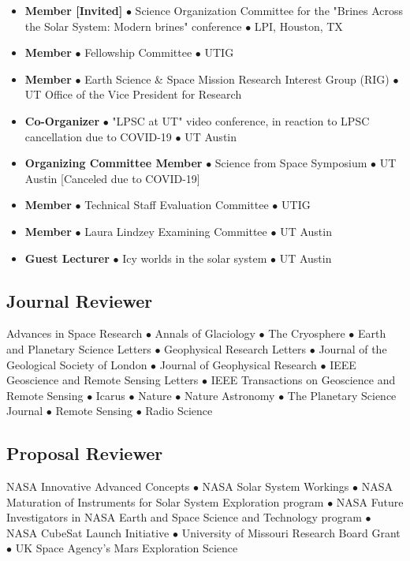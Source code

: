 \begin{itemize}[leftmargin=5.8em, labelsep=1.5em]
    \item[\texttt{2021}] \textbf{Member [Invited]} $\bullet$ Science Organization Committee for the "Brines Across the Solar System: Modern brines" conference $\bullet$ LPI, Houston, TX
    \item[\texttt{2019-2021}] \textbf{Member} $\bullet$ Fellowship Committee $\bullet$ UTIG
    \item[\texttt{2019-2020}] \textbf{Member} $\bullet$ Earth Science \& Space Mission Research Interest Group (RIG) $\bullet$ UT Office of the Vice President for Research
    \item[\texttt{2020}] \textbf{Co-Organizer} $\bullet$ "LPSC at UT" video conference, in reaction to LPSC cancellation due to COVID-19 $\bullet$ UT Austin
    \item[\texttt{2020}] \textbf{Organizing Committee Member} $\bullet$ Science from Space Symposium $\bullet$ UT Austin [Canceled due to COVID-19]
    \item[\texttt{2017-18}] \textbf{Member} $\bullet$ Technical Staff Evaluation Committee $\bullet$ UTIG
    \item[\texttt{2017}] \textbf{Member} $\bullet$ Laura Lindzey Examining Committee $\bullet$ UT Austin
    \item[\texttt{2016}] \textbf{Guest Lecturer} $\bullet$ Icy worlds in the solar system $\bullet$ UT Austin
\end{itemize}

\vspace{-2em}
\subsection*{Journal Reviewer}

Advances in Space Research $\bullet$ Annals of Glaciology $\bullet$ The Cryosphere $\bullet$ Earth and Planetary Science Letters $\bullet$ Geophysical Research Letters $\bullet$ Journal of the Geological Society of London $\bullet$ Journal of Geophysical Research $\bullet$ IEEE Geoscience and Remote Sensing Letters $\bullet$ IEEE Transactions on Geoscience and Remote Sensing $\bullet$ Icarus $\bullet$ Nature $\bullet$ Nature Astronomy $\bullet$ The Planetary Science Journal $\bullet$ Remote Sensing $\bullet$ Radio Science

\vspace{-1em}
\subsection*{Proposal Reviewer}
 NASA Innovative Advanced Concepts $\bullet$ NASA Solar System Workings $\bullet$ NASA Maturation of Instruments for Solar System Exploration program $\bullet$ NASA Future Investigators in NASA Earth and Space Science and Technology program $\bullet$ NASA CubeSat Launch Initiative $\bullet$ University of Missouri Research Board Grant $\bullet$ UK Space Agency’s Mars Exploration Science

